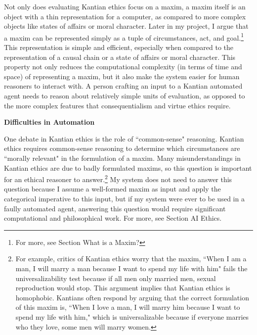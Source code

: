 \begin{isabellebody}
\begin{isamarkuptext}
Not only does evaluating Kantian ethics focus on a maxim, a maxim itself is an object
with a thin representation for a computer, as compared to more complex objects like states of 
affairs or moral character. Later in my project, I argue that a maxim can be represented simply as 
a tuple of circumstances, act, and goal.\footnote{For more, see Section What is a Maxim?} This representation
is simple and efficient, especially when compared to the representation of a causal chain or a state of 
affairs or moral character. This property not only reduces the computational complexity
(in terms of time and space) of representing a maxim, but it also make the system easier for human reasoners
to interact with. A person crafting an input to a Kantian automated agent needs to reason about relatively
simple units of evaluation, as opposed to the more complex features that consequentialism and virtue
ethics require.%
\end{isamarkuptext}\isamarkuptrue%
%
\begin{isamarkuptext}%
\textbf{Difficulties in Automation}%
\end{isamarkuptext}\isamarkuptrue%
%
\begin{isamarkuptext}%
One debate in Kantian 
ethics is the role of ``common-sense" reasoning. Kantian ethics requires common-sense reasoning to 
determine which circumstances are ``morally relevant" in the formulation of a maxim. Many misunderstandings
in Kantian ethics are due to badly formulated maxims, so this question is important for an ethical 
reasoner to answer.\footnote{For example, critics of Kantian ethics worry that the maxim, ``When I am a
man, I will marry a man because I want to spend my life with him" fails the universalizability
test because if all men only married men, sexual reproduction would stop. This argument implies 
that Kantian ethics is homophobic. Kantians often respond by arguing that the correct formulation of 
this maxim is, ``When I love a man, I will marry him because I want to spend my life with him," which
is universalizable because if everyone marries who they love, some men will marry women.} 
My system does not need to answer this question because I assume a well-formed
maxim as input and apply the categorical imperative to this input, but if my system were ever to be used
in a faully automated agent, answering this question would require significant computational and philosophical
work. For more, see Section AI Ethics.


\end{isamarkuptext}
\end{isabellebody}

